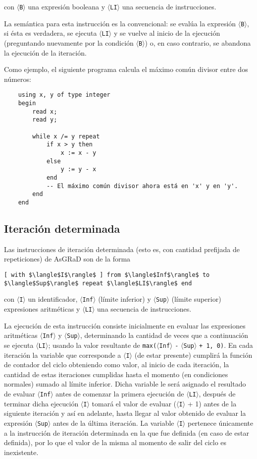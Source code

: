 \documentclass[letterpaper,11pt]{article}
\newcommand{\asgrad}{AsGRaD\xspace}
\newcommand{\general}[1]{$\langle$\texttt{#1}$\rangle$}
\begin{document}
\noindent
con \general{B} una expresión booleana y \general{LI} una secuencia de instrucciones.

La semántica para esta instrucción es la convencional: se evalúa la expresión \general{B}, si ésta es verdadera, se ejecuta \general{LI} y se vuelve al inicio de la ejecución (preguntando nuevamente por la condición \general{B}) o, en caso contrario, se abandona la ejecución de la iteración.

Como ejemplo, el siguiente programa calcula el máximo común divisor entre dos números:

\begin{lstlisting}
    using x, y of type integer
    begin
        read x;
        read y;
        
        while x /= y repeat
            if x > y then
                x := x - y
            else
                y := y - x
            end
            -- El máximo común divisor ahora está en 'x' y en 'y'.
        end
    end
\end{lstlisting}

\subsection{Iteración determinada}

Las instrucciones de iteración determinada (esto es, con cantidad prefijada de repeticiones) de \asgrad son de la forma

\begin{lstlisting}[mathescape=true]
    [ with $\langle$I$\rangle$ ] from $\langle$Inf$\rangle$ to $\langle$Sup$\rangle$ repeat $\langle$LI$\rangle$ end
\end{lstlisting}

\noindent
con \general{I} un identificador, \general{Inf} (límite inferior) y \general{Sup} (límite superior) expresiones aritméticas y \general{LI} una secuencia de instrucciones.

La ejecución de esta instrucción consiste inicialmente en evaluar las expresiones aritméticas \general{Inf} y \general{Sup}, determinando la cantidad de veces que a continuación se ejecuta \general{LI}; usando la valor resultante de \texttt{max(}\general{Inf} \texttt{-} \general{Sup} \texttt{+ 1, 0)}. En cada iteración la variable que corresponde a \general{I} (de estar presente) cumplirá la función de contador del ciclo obteniendo como valor, al inicio de cada iteración, la cantidad de estas iteraciones cumplidas hasta el momento (en condiciones normales) sumado al límite inferior. Dicha variable le será asignado el resultado de evaluar \general{Inf} antes de comenzar la primera ejecución de \general{LI}, después de terminar dicha ejecución \general{I} tomará el valor de evaluar (\general{I} + 1) antes de la siguiente iteración y así en adelante, hasta llegar al valor obtenido de evaluar la expresión \general{Sup} antes de la última iteración. La variable \general{I} pertenece únicamente a la instrucción de iteración determinada en la que fue definida (en caso de estar definida), por lo que el valor de la misma al momento de salir del ciclo es inexistente.
\end{document}
